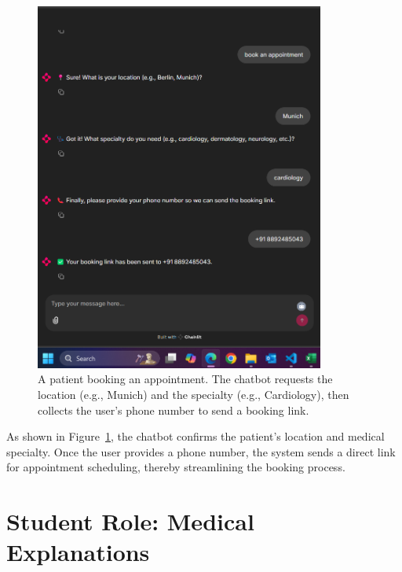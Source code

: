 \begin{figure}[htbp]
    \centering
    \includegraphics[width=0.85\textwidth]{Images/doclink1.png}
    \caption{A patient booking an appointment. The chatbot requests the location (e.g., Munich) and the specialty (e.g., Cardiology), then collects the user’s phone number to send a booking link.}
    \label{fig:book-appointment}
\end{figure}

As shown in Figure~\ref{fig:book-appointment}, the chatbot confirms the patient’s location and medical specialty. Once the user provides a phone number, the system sends a direct link for appointment scheduling, thereby streamlining the booking process.

\section{Student Role: Medical Explanations}
\label{sec:student-role}


